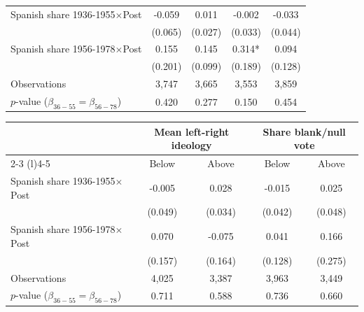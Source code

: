 \begin{table}[!h]
\begin{tabular*}{\textwidth}{l@{\extracolsep{\fill}}cccc}
\hline
Spanish share 1936-1955$\times$Post & -0.059 & 0.011 & -0.002 & -0.033 \\
 & (0.065) & (0.027) & (0.033) & (0.044) \\
Spanish share 1956-1978$\times$Post & 0.155 & 0.145 & 0.314* & 0.094 \\
  & (0.201) & (0.099) & (0.189) & (0.128) \\
\addlinespace
Observations & 3,747 & 3,665 & 3,553 & 3,859 \\
$p$-value ($\beta_{36{-}55} = \beta_{56{-}78}$) & 0.420 & 0.277 & 0.150 & 0.454 \\
\hline
\end{tabular*}
\begin{tabular*}{\textwidth}{l@{\extracolsep{\fill}}cccc}
& \multicolumn{2}{c}{Mean left-right ideology} & \multicolumn{2}{c}{Share blank/null vote} \\
\cmidrule(l){2-3} \cmidrule(l){4-5}
& Below & Above & Below & Above \\
\hline
Spanish share 1936-1955$\times$Post & -0.005 & 0.028 & -0.015 & 0.025 \\
 & (0.049) & (0.034) & (0.042) & (0.048) \\
Spanish share 1956-1978$\times$Post & 0.070 & -0.075 & 0.041 & 0.166 \\
  & (0.157) & (0.164) & (0.128) & (0.275) \\
\addlinespace
Observations & 4,025 & 3,387 & 3,963 & 3,449 \\
$p$-value ($\beta_{36{-}55} = \beta_{56{-}78}$) & 0.711 & 0.588 & 0.736 & 0.660 \\
\hline
\end{tabular*}
\addvspace{0.2em}
\captionsetup{font=footnotesize, justification=justified, singlelinecheck=false}

\end{table}
